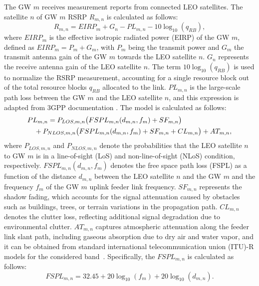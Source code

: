 The GW \( m \) receives measurement reports from connected LEO satellites. The satellite \( n \) of GW \( m \) RSRP \( R_{m,n} \) is calculated as follows:
\begin{equation}
R_{m,n} = EIRP_{m} + G_{n} - PL_{m,n} - 10 \log_{10}(q_{RB}),
\label{eq:rsrp}
\end{equation}
where \( EIRP_{m} \) is the effective isotropic radiated power (EIRP) of the GW \( m \), defined as \( EIRP_{m} = P_{m} + G_{m} \), with \( P_{m} \) being the transmit power and \( G_{m} \) the transmit antenna gain of the GW $m$ towards the LEO satellite \( n \). \( G_{n} \) represents the receive antenna gain of the LEO satellite \( n \). The term \( 10 \log_{10}(q_{RB}) \) is used to normalize the RSRP measurement, accounting for a single resource block out of the total resource blocks \( q_{RB} \) allocated to the link. $PL_{m,n}$ is the large-scale path loss between the GW \( m \) and the LEO satellite \( n \), and this expression is adapted from 3GPP documentation \cite{3gppchanel}. The model is calculated as follows:
\begin{align}
&PL_{m,n} = P_{{LOS,{m,n}}} \big( FSPL_{m,n}(d_{m,n}, f_m) + SF_{m,n} \big)\notag\\
&\quad + P_{{NLOS,{m,n}}} \big( FSPL_{m,n}(d_{m,n}, f_m) + SF_{m,n} + CL_{m,n}  \big) + AT_{m,n},
\end{align}
where $P_{{LOS,{m,n}}}$ and $P_{{NLOS,{m,n}}}$ denote the probabilities that the LEO satellite \( n \) to GW \( m \) is in a line-of-sight (LoS) and non-line-of-sight (NLoS) condition, respectively. $FSPL_{m,n}(d_{m,n}, f_m)$ denotes the free space path loss (FSPL) as a function of the distance $d_{m,n}$ between the LEO satellite \( n \) and the GW \( m \) and the frequency $f_m$ of the GW \( m \) uplink feeder link frequency. $SF_{m,n}$ represents the shadow fading, which accounts for the signal attenuation caused by obstacles such as buildings, trees, or terrain variations in the propagation path. $CL_{m,n}$ denotes the clutter loss, reflecting additional signal degradation due to environmental clutter. $AT_{m,n}$ captures atmospheric attenuation along the feeder link slant path, including gaseous absorption due to dry air and water vapor, and it can be obtained from standard international telecommunication union (ITU)-R models for the considered band~\cite{ITU-R-P.676-13}. Specifically, the $FSPL_{m,n}$ is calculated as follows:
\begin{equation}
FSPL_{m,n} = 32.45 + 20\log_{10}(f_m) + 20\log_{10}(d_{m,n}).
\end{equation}

